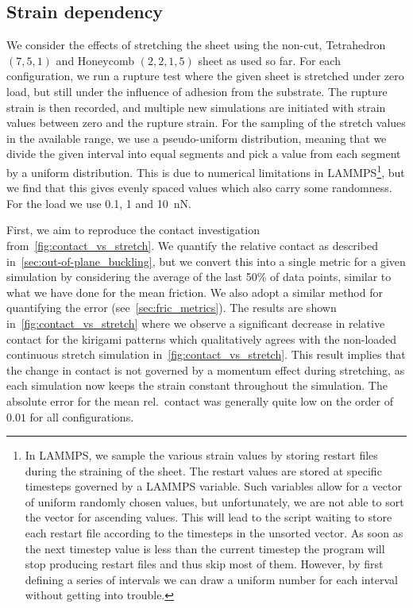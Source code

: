 \subsection{Strain dependency}\label{sec:stretch_dependency}
We consider the effects of stretching the sheet using the non-cut, Tetrahedron $(7,5,1)$ and Honeycomb $(2,2,1,5)$ sheet as used so far. For each configuration, we run a rupture test where the given sheet is stretched under zero load, but still under the influence of adhesion from the substrate. The rupture strain is then recorded, and multiple new simulations are initiated with strain values between zero and the rupture strain. For the sampling of the stretch values in the available range, we use a pseudo-uniform distribution, meaning that we divide the given interval into equal segments and pick a value from each segment by a uniform
distribution. This is due to numerical limitations in LAMMPS\footnote{In LAMMPS, we sample the various strain values by storing restart files during the straining of the sheet. The restart values are stored at specific timesteps governed by a LAMMPS variable. Such variables allow for a vector of uniform randomly chosen values, but unfortunately, we are not able to sort the vector for ascending values. This will lead to the script waiting to store each restart file according to the timesteps in the unsorted vector. As soon as the next timestep value is less than the current timestep the program will stop producing restart files and thus skip most of them. However, by first defining a series of intervals we can draw a uniform number for each interval without getting into trouble.}, but we find that this gives evenly spaced values which also carry some randomness. For the load we use 0.1, 1 and \SI{10}{nN}.

First, we aim to reproduce the contact investigation from~\cref{fig:contact_vs_stretch}. We quantify the relative contact as described in~\cref{sec:out-of-plane_buckling}, but we convert this into a single metric for a given simulation by considering the average of the last 50\% of data points, similar
to what we have done for the mean friction. We also adopt a similar method for quantifying the error (see~\cref{sec:fric_metrics}). The results are shown
in~\cref{fig:contact_vs_stretch} where we observe a significant decrease in
relative contact for the kirigami patterns which qualitatively agrees with the non-loaded continuous stretch simulation in~\cref{fig:contact_vs_stretch}. This result implies that the change in contact is not governed by a momentum effect during stretching, as each simulation now keeps the strain constant throughout the simulation. The absolute error for the mean rel.\ contact was generally quite low on the order of $0.01$ for all configurations. 

